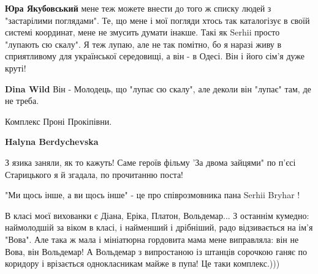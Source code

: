 \begin{itemize}
\begin{itemize}
\textbf{Юра Якубовський} мене теж можете внести до того ж списку людей з
"застарілими поглядами". Те, що мене і мої погляди хтось так каталогізує в
своїй системі координат, мене не змусить думати інакше. Такі як Serhii просто
"лупають сю скалу". Я теж лупаю, але не так помітно, бо я наразі живу в
сприятливому для української середовищі, а він - в Одесі. Він і його сім'я дуже
круті!

 
\textbf{Dina Wild} Він - Молодець, що "лупає сю скалу", але деколи він "лупає" там, де не треба.
\end{itemize}

 
Комплекс Проні Прокіпівни.

\begin{itemize}
 
\textbf{Halyna Berdychevska} 

З язика заняли, як то кажуть! Саме героїв фільму 'За двома зайцями" по п'єсі
Старицького я й згадала, по прочитанню поста!

"Ми щось інше, а ви щось інше" - це про співрозмовника пана Serhii Bryhar !

 

В класі моєї вихованки є Діана, Еріка, Платон, Вольдемар... З останнім кумедно:
наймолодшій за віком в класі, і найменший і дрібніший, радо відзивається на
ім'я "Вова". Але така ж мала і мініатюрна гордовита мама мене виправляла: він
не Вова, він Вольдемар! А Вольдемар з випростаною із штанців сорочкою ганяє по
коридору і врізається однокласникам майже в пупа! Це таки комплекс.)))



\end{itemize}
\end{itemize}
